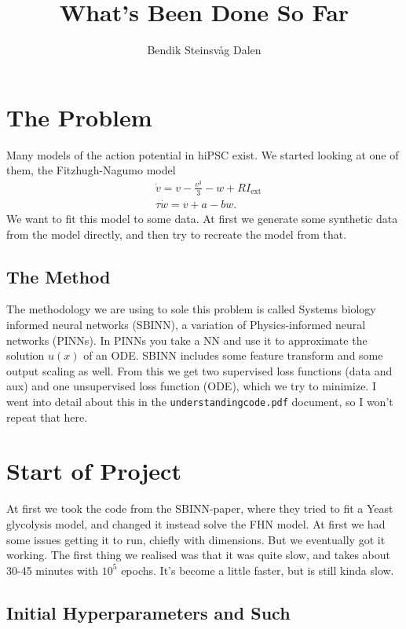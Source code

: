 \documentclass[a4paper]{article}
\title{What's Been Done So Far}
\author{Bendik Steinsvåg Dalen}
\begin{document}
\maketitle


\section{The Problem}	

Many models of the action potential in hiPSC exist. We started looking at one of them, the Fitzhugh-Nagumo model
\begin{align}\label{eq:fhn} %
	&\dot{v}=v-\frac{v^{3}}{3}-w+R I_{\mathrm{ext}} \\
	&\tau \dot{w}=v+a-b w.
\end{align}
We want to fit this model to some data. At first we generate some synthetic data from the model directly, and then try to recreate the model from that.

\subsection{The Method}

The methodology we are using to sole this problem is called Systems biology informed neural networks (SBINN), a variation of Physics-informed  neural  networks (PINNs). In PINNs you take a NN and use it to approximate the solution $u(x)$ of an ODE. SBINN includes some feature transform and some output scaling as well. From this we get two supervised loss functions (data and aux) and one unsupervised loss function (ODE), which we try to minimize. I went into detail about this in the \lstinline|understandingcode.pdf| document, so I won't repeat that here. 


\section{Start of Project}

At first we took the code from the SBINN-paper, where they tried to fit a Yeast glycolysis model, and changed it instead solve the FHN model. At first we had some issues getting it to run, chiefly with dimensions. But we eventually got it working. The first thing we realised was that it was quite slow, and takes about 30-45 minutes with $10^5$ epochs. It's become a little faster, but is still kinda slow.

\subsection{Initial Hyperparameters and Such}
\end{document}
